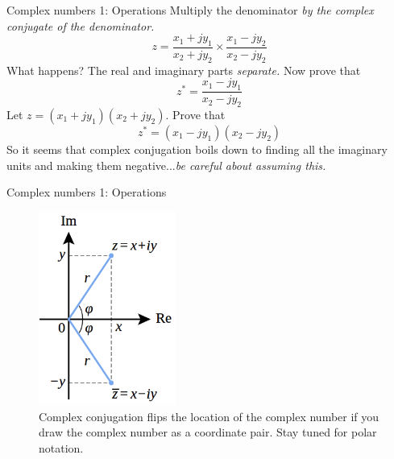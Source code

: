 \documentclass{beamer}
\begin{document}
\begin{frame}{Complex numbers 1: Operations}
Multiply the denominator \textit{by the complex conjugate of the denominator.}
\begin{equation}
z = \frac{x_1 + jy_1}{x_2 + j y_2} \times \frac{x_1-j y_2}{x_2-j y_2}
\end{equation}
What happens?  The real and imaginary parts \textit{separate.}  Now prove that
\begin{equation}
z^* = \frac{x_1 - jy_1}{x_2 - j y_2}
\end{equation}
Let $z = (x_1+jy_1)(x_2+jy_2)$.  Prove that
\begin{equation}
z^* = (x_1 - jy_1)(x_2-jy_2)
\end{equation}
So it seems that complex conjugation boils down to finding all the imaginary units and making them negative...\textit{be careful about assuming this.}
\end{frame}

\begin{frame}{Complex numbers 1: Operations}
\begin{figure}
\centering
\includegraphics[width=0.4\textwidth]{figures/cc.png}
\caption{\label{fig:complex2a} Complex conjugation flips the location of the complex number if you draw the complex number as a coordinate pair.  Stay tuned for \alert{polar notation}.}
\end{figure}
\end{frame}
\end{document}
